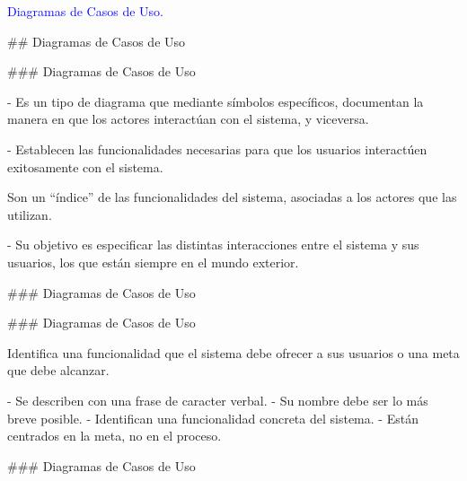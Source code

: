 \begin{rboxx}{}
    \textcolor{blue}{Diagramas de Casos de Uso.}
\end{rboxx}

## Diagramas de Casos de Uso

### Diagramas de Casos de Uso


- Es un tipo de diagrama que mediante símbolos específicos, documentan la manera en que los
actores interactúan con el sistema, y viceversa.

- Establecen las funcionalidades necesarias para que los usuarios interactúen exitosamente con el sistema.

\begin{rboxx}{}
    Son un ``índice'' de las funcionalidades del sistema,
    asociadas a los actores que las utilizan.
\end{rboxx}

- Su objetivo es especificar las distintas interacciones entre el sistema y sus usuarios, los que
están siempre en el mundo exterior.

### Diagramas de Casos de Uso


\exUseCaseA

### Diagramas de Casos de Uso


\columnsbegin


\centering{}

 Identifica una funcionalidad que el sistema
debe ofrecer a sus usuarios o una meta que debe alcanzar.\newline

\columnsend

- Se describen con una frase de caracter verbal.
- Su nombre debe ser lo más breve posible.
- Identifican una funcionalidad concreta del sistema.
- Están centrados en la meta, no en el proceso.


### Diagramas de Casos de Uso


\columnsbegin

